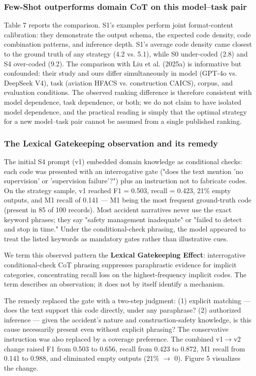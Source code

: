 \documentclass[11pt]{article}
\begin{document}
\subsubsection{Few-Shot outperforms domain CoT on this model--task pair}
Table 7 reports the comparison. S1's examples perform joint format-content calibration: they demonstrate the output schema, the expected code density, code combination patterns, and inference depth. S1's average code density came closest to the ground truth of any strategy (4.2 vs. 5.1), while S0 under-coded (2.8) and S4 over-coded (9.2). The comparison with Liu et al. (2025a) is informative but confounded: their study and ours differ simultaneously in model (GPT-4o vs. DeepSeek V4), task (aviation HFACS vs. construction CAICS), corpus, and evaluation conditions. The observed ranking difference is therefore consistent with model dependence, task dependence, or both; we do not claim to have isolated model dependence, and the practical reading is simply that the optimal strategy for a new model--task pair cannot be assumed from a single published ranking.

\subsubsection{The Lexical Gatekeeping observation and its remedy}
The initial S4 prompt (v1) embedded domain knowledge as conditional checks: each code was presented with an interrogative gate ("does the text mention 'no supervision' or 'supervision failure'?") plus an instruction not to fabricate codes. On the strategy sample, v1 reached F1 = 0.503, recall = 0.423, 21\% empty outputs, and M1 recall of 0.141 --- M1 being the most frequent ground-truth code (present in 85 of 100 records). Most accident narratives never use the exact keyword phrases; they say "safety management inadequate" or "failed to detect and stop in time." Under the conditional-check phrasing, the model appeared to treat the listed keywords as mandatory gates rather than illustrative cues.

We term this observed pattern the \textbf{Lexical Gatekeeping Effect}: interrogative conditional-check CoT phrasing suppresses paraphrastic evidence for implicit categories, concentrating recall loss on the highest-frequency implicit codes. The term describes an observation; it does not by itself identify a mechanism.

The remedy replaced the gate with a two-step judgment: (1) explicit matching --- does the text support this code directly, under any paraphrase? (2) authorized inference --- given the accident's nature and construction-safety knowledge, is this cause necessarily present even without explicit phrasing? The conservative instruction was also replaced by a coverage preference. The combined v1$\rightarrow$v2 change raised F1 from 0.503 to 0.656, recall from 0.423 to 0.872, M1 recall from 0.141 to 0.988, and eliminated empty outputs (21\% $\rightarrow$ 0). Figure 5 visualizes the change.
\end{document}
